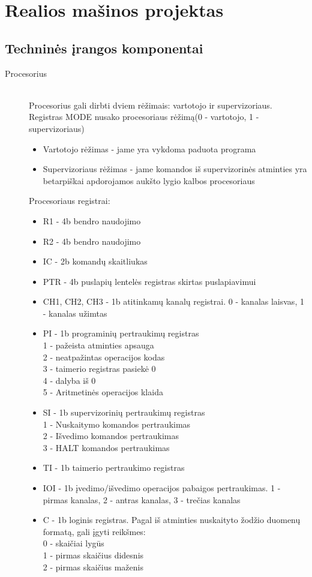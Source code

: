 \section{Realios mašinos projektas}

\subsection{Techninės įrangos komponentai}

\begin{description}
  \item[Procesorius]\leavevmode \\
Procesorius gali dirbti dviem rėžimais: vartotojo ir supervizoriaus. Registras MODE nusako procesoriaus rėžimą(0 - vartotojo, 1 - supervizoriaus)
\begin{itemize}
  \item Vartotojo rėžimas - jame yra vykdoma paduota programa
  \item Supervizoriaus rėžimas - jame komandos iš supervizorinės atminties yra betarpiškai apdorojamos aukšto lygio kalbos procesoriaus
\end{itemize}
Procesoriaus registrai:
\begin{itemize}
  \item R1 - 4b bendro naudojimo
  \item R2 - 4b bendro naudojimo
  \item IC - 2b komandų skaitliukas
  \item PTR - 4b puslapių lentelės registras skirtas puslapiavimui
  \item CH1, CH2, CH3 - 1b atitinkamų kanalų registrai. 0 - kanalas laisvas, 1 - kanalas užimtas
  \item PI - 1b programinių pertraukimų registras\leavevmode
		\\1 - pažeista atminties apsauga
		\\2 - neatpažintas operacijos kodas
           	\\3 - taimerio registras pasiekė 0
		\\4 - dalyba iš 0
		\\5 - Aritmetinės operacijos klaida
  \item SI - 1b supervizorinių pertraukimų registras\leavevmode
		\\1 - Nuskaitymo komandos pertraukimas
		\\2 - Išvedimo komandos pertraukimas
		\\3 - HALT komandos pertraukimas
  \item TI - 1b taimerio pertraukimo registras
  \item IOI - 1b įvedimo/išvedimo operacijos pabaigos pertraukimas. 1 - pirmas kanalas, 2 - antras kanalas, 3 - trečias kanalas
  \item C - 1b loginis registras. Pagal iš atminties nuskaityto žodžio duomenų formatą, gali įgyti reikšmes: \leavevmode
		\\ 0 - skaičiai lygūs
		\\ 1 - pirmas skaičius didesnis
		\\ 2 - pirmas skaičius maženis


\end{itemize}
\end{description}
